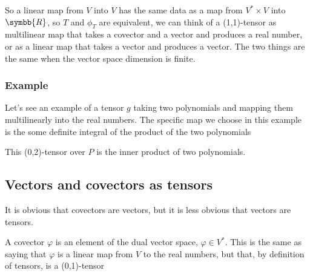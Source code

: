 So a linear map from $V$ into $V$ has the same data as a map from $V^\ast\times V$ into $\symbb{R}$,
so $T$ and $\phi_T$ are equivalent, we can think of a (1,1)-tensor as multilinear map
that takes a covector and a vector and produces a real number, or as a linear map that
takes a vector and produces a vector. The two things are the same when the vector space
dimension is finite.


\subsubsection{Example}
Let's see an example of a tensor $g$ taking two polynomials and mapping them multilinearly into
the real numbers. The specific map we choose in this example is the some definite integral of the
product of the two polynomials
\begin{center}
\end{center}
This (0,2)-tensor over $P$ is the inner product of two polynomials.

\subsection{Vectors and covectors as tensors}
It is obvious that covectors are vectors, but it is less obvious that vectors are tensors.

A covector $\varphi$ is an element of the dual vector space, $\varphi\in V^\ast$. This is the same as
saying that $\varphi$ is a linear map from $V$ to the real numbers, but that, by definition of
tensors, is a (0,1)-tensor
\begin{center}
\end{center}

